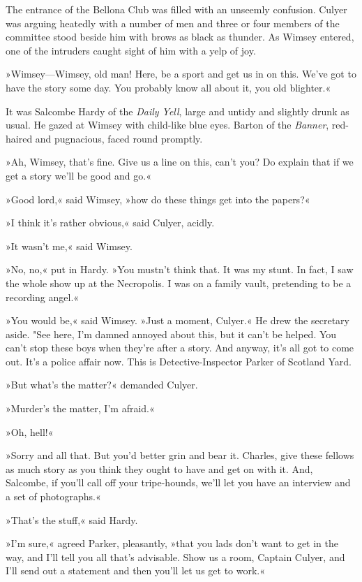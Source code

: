 The entrance of the Bellona Club was filled with an unseemly confusion. Culyer was arguing heatedly with a number of men and three or four members of the committee stood beside him with brows as black as thunder. As Wimsey entered, one of the intruders caught sight of him with a yelp of joy.

»Wimsey\allowbreak---\allowbreak Wimsey, old man! Here, be a sport and get us in on this. We've got to have the story some day. You probably know all about it, you old blighter.«

It was Salcombe Hardy of the \textit{Daily Yell}, large and untidy and slightly drunk as usual. He gazed at Wimsey with child-like blue eyes. Barton of the \textit{Banner}, red-haired and pugnacious, faced round promptly.

»Ah, Wimsey, that's fine. Give us a line on this, can't you? Do explain that if we get a story we'll be good and go.«

»Good lord,« said Wimsey, »how do these things get into the papers?«

»I think it's rather obvious,« said Culyer, acidly.

»It wasn't me,« said Wimsey.

»No, no,« put in Hardy. »You mustn't think that. It was my stunt. In fact, I saw the whole show up at the Necropolis. I was on a family vault, pretending to be a recording angel.«

»You would be,« said Wimsey. »Just a moment, Culyer.« He drew the secretary aside. "See here, I'm damned annoyed about this, but it can't be helped. You can't stop these boys when they're after a story. And anyway, it's all got to come out. It's a police affair now. This is Detective-Inspector Parker of Scotland Yard.

»But what's the matter?« demanded Culyer.

»Murder's the matter, I'm afraid.«

»Oh, hell!«

»Sorry and all that. But you'd better grin and bear it. Charles, give these fellows as much story as you think they ought to have and get on with it. And, Salcombe, if you'll call off your tripe-hounds, we'll let you have an interview and a set of photographs.«

»That's the stuff,« said Hardy.

»I'm sure,« agreed Parker, pleasantly, »that you lads don't want to get in the way, and I'll tell you all that's advisable. Show us a room, Captain Culyer, and I'll send out a statement and then you'll let us get to work.«


